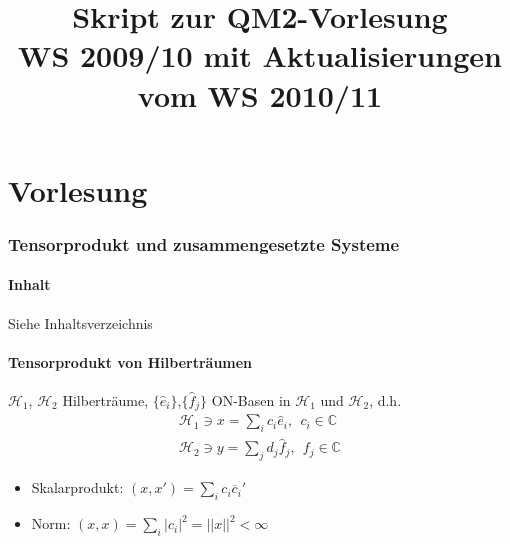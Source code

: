 \documentclass[twoside,a4paper]{scrartcl}
\renewcommand{\1}{\mathds{1}}
\begin{document}

\clearpage
\thispagestyle{empty}

	
\title{\huge  \textbf{Skript zur QM2-Vorlesung}\\
			  \textbf{WS 2009/10 mit Aktualisierungen vom WS 2010/11}}
		
\maketitle
\newpage
\thispagestyle{empty}
\mbox{}
\newpage
\tableofcontents
\newpage
\thispagestyle{empty}
\mbox{}
\newpage
\part{Vorlesung}
\section{Tensorprodukt und zusammengesetzte Systeme}
\subsection{Inhalt}
Siehe Inhaltsverzeichnis
\subsection{Tensorprodukt von Hilberträumen}
$\mathcal H_1$, $\mathcal H_2$ Hilberträume, $\{\hat e_i \}$,$\{\hat f_j \}$ ON-Basen in $\mathcal H_1$ und $\mathcal H_2$, d.h.
\begin{align}
 \mathcal H_1 \ni x = \sum_i c_i \hat e_i, \ \ c_i \in \mathbb C \\
 \mathcal H_2 \ni y = \sum_j d_j \hat f_j, \ \ f_j \in \mathbb C 
\end{align}
\begin{itemize}
 \item Skalarprodukt: $(x,x')=\sum_i c_i \overline c_i'$
 \item Norm: $(x,x)=\sum_i |c_i|^2=||x||^2< \infty$
\end{itemize}
\end{document}
